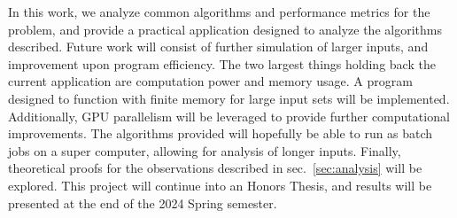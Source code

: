 In this work, we analyze common algorithms and performance metrics for the \KS problem, and provide a practical application designed to analyze the algorithms described. Future work will consist of further simulation of larger inputs, and improvement upon program efficiency. The two largest things holding back the current application are computation power and memory usage. A program designed to function with finite memory for large input sets will be implemented. Additionally, GPU parallelism will be leveraged to provide further computational improvements. The algorithms provided will hopefully be able to run as batch jobs on a super computer, allowing for analysis of longer inputs. Finally, theoretical proofs for the observations described in sec.~\ref{sec:analysis} will be explored. This project will continue into an Honors Thesis, and results will be presented at the end of the 2024 Spring semester.